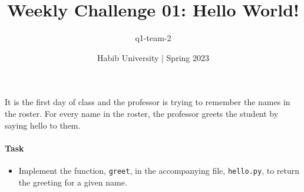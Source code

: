 \documentclass[a4paper]{exam}
\title{Weekly Challenge 01: Hello World!}
\author{q1-team-2}  %
\date{Habib University | Spring 2023}
\begin{document}
\maketitle

\begin{questions}

	It is the first day of class and the professor is trying to remember the names in the roster. For every name in the roster, the professor greets the student by saying hello to them.

	\paragraph{Task}
	\begin{itemize}
		\item Implement the function, \texttt{greet}, in the accompanying file, \texttt{hello.py}, to return the greeting for a given name.
	\end{itemize}
\end{questions}
\end{document}
